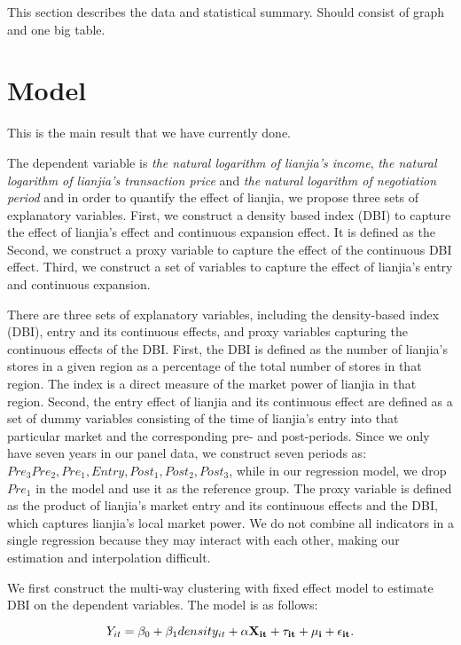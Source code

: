 \documentclass[12pt]{article}
\begin{document}
This section describes the data and statistical summary. Should consist of graph and one big table.

\section{Model \label{sec:model}}

This is the main result that we have currently done.

The dependent variable is \emph{the natural logarithm of lianjia's income}, \emph{the natural logarithm of lianjia's transaction price} and \emph{the natural logarithm of negotiation period} and in order to quantify the effect of lianjia, we propose three sets of explanatory variables. First, we construct a density based index (DBI) to capture the effect of lianjia's effect and continuous expansion effect. It is defined as the  Second, we construct a proxy variable to capture the effect of the continuous DBI effect. Third, we construct a set of variables to capture the effect of lianjia's entry and continuous expansion.

There are three sets of explanatory variables, including the density-based index (DBI), entry and its continuous effects, and proxy variables capturing the continuous effects of the DBI. First, the DBI is defined as the number of lianjia's stores in a given region as a percentage of the total number of stores in that region. The index is a direct measure of the market power of lianjia in that region. Second, the entry effect of lianjia and its continuous effect are defined as a set of dummy variables consisting of the time of lianjia's entry into that particular market and the corresponding pre- and post-periods. Since we only have seven years in our panel data, we construct seven periods as: $Pre_3 Pre_2, Pre_1, Entry, Post_1, Post_2, Post_3$, while in our regression model, we drop $Pre_1$ in the model and use it as the reference group. The proxy variable is defined as the product of lianjia's market entry and its continuous effects and the DBI, which captures lianjia's local market power. We do not combine all indicators in a single regression because they may interact with each other, making our estimation and interpolation difficult.

We first construct the multi-way clustering with fixed effect model to estimate DBI on the dependent variables. The model is as follows:

\begin{equation}
  Y_{it} = \beta_0 + \beta_1 density_{it} + \bf{\alpha} \bf{X}_{it} + \tau_{it} + \mu_i + \epsilon_{it}.
\end{equation}
\end{document}

